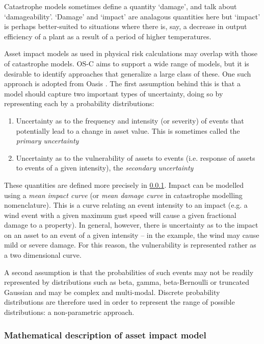 \documentclass[a4paper,11pt]{extarticle} %
\begin{document}
Catastrophe models sometimes define a quantity `damage', and talk about `damageability'. `Damage' and `impact' are analagous quantities here but `impact' is perhaps better-suited to situations where there is, say, a decrease in output efficiency of a plant as a result of a period of higher temperatures. 

Asset impact models as used in physical risk calculations may overlap with those of catastrophe models. OS-C aims to support a wide range of models, but it is desirable to identify approaches that generalize a large class of these. One such approach is adopted from Oasis \cite{OasisLMF}. The first assumption behind this is that a model should capture two important types of uncertainty, doing so by representing each by a probability distributions:
\begin{enumerate}
	\item Uncertainty as to the frequency and intensity (or severity) of events that potentially lead to a change in asset value. This is sometimes called the {\it primary uncertainty}
	\item Uncertainty as to the vulnerability of assets to events (i.e. response of assets to events of a given intensity), the {\it secondary uncertainty}
\end{enumerate}

These quantities are defined more precisely in \ref{Sec:MathematicalDescriptionOfAssetImpactModel}. Impact can be modelled using a {\it mean impact curve} (or {\it mean damage curve} in catastrophe modelling nomenclature). This is a curve relating an event intensity to an impact (e.g. a wind event with a given maximum gust speed will cause a given fractional damage to a property). In general, however, there is uncertainty as to the impact on an asset to an event of a given intensity -- in the example, the wind may cause mild or severe damage. For this reason, the vulnerability is represented rather as a two dimensional curve.

A second assumption is that the probabilities of such events may not be readily represented by distributions such as beta, gamma, beta-Bernoulli or truncated Gaussian and may be complex and multi-modal. Discrete probability distributions are therefore used in order to represent the range of possible distributions: a non-parametric approach.   

\subsubsection{Mathematical description of asset impact model}
\label{Sec:MathematicalDescriptionOfAssetImpactModel}
\end{document}
